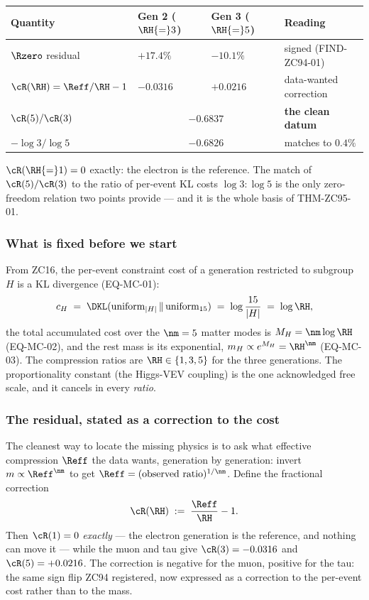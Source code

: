 \documentclass[12pt, a4paper]{article}
\begin{document}
\begin{keybox}[title={Numerical Summary --- the one clean datum}]
{\footnotesize\renewcommand{\arraystretch}{1.3}
\begin{center}
\begin{tabular}{@{}p{3.3cm}p{2.4cm}p{2.4cm}p{3.2cm}@{}}
\toprule
\textbf{Quantity} & \textbf{Gen 2 ($\RH{=}3$)} & \textbf{Gen 3 ($\RH{=}5$)} &
\textbf{Reading} \\
\midrule
$\Rzero$ residual & $+17.4\%$ & $-10.1\%$ & signed (FIND-ZC94-01) \\
$\cR(\RH)=\Reff/\RH-1$ & $-0.0316$ & $+0.0216$ & data-wanted correction \\
$\cR(5)/\cR(3)$ & \multicolumn{2}{c}{$-0.6837$} & {\bf the clean datum} \\
$-\log 3/\log 5$ & \multicolumn{2}{c}{$-0.6826$} & matches to $0.4\%$ \\
\bottomrule
\end{tabular}
\end{center}}
\smallskip
\footnotesize $\cR(\RH{=}1)=0$ exactly: the electron is the reference. The match
of $\cR(5)/\cR(3)$ to the ratio of per-event KL costs $\log 3:\log 5$ is the
only zero-freedom relation two points provide --- and it is the whole basis of
THM-ZC95-01.
\end{keybox}

\subsubsection{What is fixed before we start}

From ZC16, the per-event constraint cost of a generation restricted to subgroup
$H$ is a KL divergence (EQ-MC-01):
\[
  c_H \;=\; \DKL(\text{uniform}_{|H|}\,\|\,\text{uniform}_{15})
        \;=\; \log\frac{15}{|H|} \;=\; \log\RH,
\]
the total accumulated cost over the $\nm=5$ matter modes is $M_H=\nm\log\RH$
(EQ-MC-02), and the rest mass is its exponential, $m_H\propto e^{M_H}=\RH^{\nm}$
(EQ-MC-03). The compression ratios are $\RH\in\{1,3,5\}$ for the three
generations. The proportionality constant (the Higgs-VEV coupling) is the one
acknowledged free scale, and it cancels in every \emph{ratio}.

\subsubsection{The residual, stated as a correction to the cost}

The cleanest way to locate the missing physics is to ask what effective
compression $\Reff$ the data wants, generation by generation: invert
$m\propto\Reff^{\nm}$ to get $\Reff=(\text{observed ratio})^{1/\nm}$. Define the
fractional correction
\[
  \cR(\RH) \;:=\; \frac{\Reff}{\RH}-1 .
\]
Then $\cR(1)=0$ \emph{exactly} --- the electron generation is the reference, and
nothing can move it --- while the muon and tau give $\cR(3)=-0.0316$ and
$\cR(5)=+0.0216$. The correction is negative for the muon, positive for the tau:
the same sign flip ZC94 registered, now expressed as a correction to the
per-event cost rather than to the mass.
\end{document}
